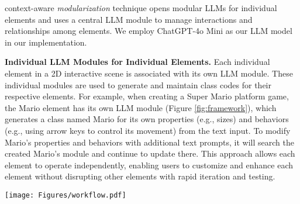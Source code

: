 context-aware \emph{modularization} technique  %
opens modular LLMs for individual elements and {uses} a central LLM module {to manage} %
interactions and relationships {among} %
elements.  {We employ ChatGPT-4o Mini as our LLM {model} %
in our implementation.}

\textbf{Individual LLM Modules for Individual Elements.} Each individual element in a 2D interactive scene is associated with its own LLM module. These individual modules are {used}
to %
generate and maintain 
class {codes}
{for} %
their respective elements. For example, when creating a Super Mario platform game, the Mario element has its own LLM module (Figure \ref{fig:framework}), which generates a class named Mario for its own properties (e.g., sizes) and behaviors (e.g., using arrow keys to control its movement) from the text input. {To} %
modify Mario's properties and behaviors {with additional text prompts}, it will search the created Mario's module and continue to update there. {This} %
approach allows each element to operate independently, enabling users to customize and enhance each element without disrupting other elements with rapid iteration and testing.



\begin{figure*}[t]
\texttt{[image: Figures/workflow.pdf]}
  \caption{
  }
  \label{fig:workflow}
  \vspace{-2mm}
\end{figure*}

